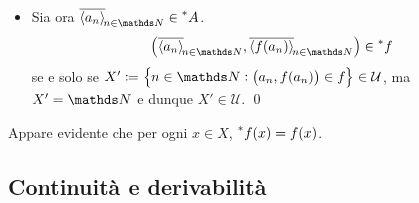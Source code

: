 {\begin{itemize}
        Si definisca dunque una successione $ \sequence{c_{n} } $: \begin{equation*}
            c_{n}= \begin{cases}
                b_{n} & n \in X\\ 
                f(a_{n}) & n \notin X 
            \end{cases} 
        \end{equation*}allora $ \filtersequence{c_{n}}=\filtersequence{b_{n}} $ poiché $ X \in \mathcal{U} $, e \begin{equation*}
            \forall\, n \in \N:\, c_{n} = f(a_{n}). 
        \end{equation*}Inoltre, per la Proposizione , $ \filtersequence{a_{n}} \in \nonstandard{A} $, e pertanto \begin{equation*}
            \left(\filtersequence{a_{n} }, \filtersequence{b_{n} }\right) \in \set{\left(\filtersequence{a_{n}}, \filtersequence{f(a_{n} )}\right): \filtersequence{a_{n}} \in \nonstandard{A}}.
        \end{equation*}
        \item[\boxed{\supseteq}] Sia ora $ \filtersequence{a_{n}} \in \nonstandard{A} $. \begin{equation*}
            \left(\filtersequence{a_{n}}, \filtersequence{f(a_{n} )}\right) \in \nonstandard{f}
        \end{equation*}se e solo se $ X'\coloneqq\set{n \in \N: \left(a_{n}, f(a_{n} ) \right) \in f} \in \mathcal{U} $, ma $ X' = \N $ e dunque $ X' \in \mathcal{U} $.
    \qed\end{itemize}
}

Appare evidente che per ogni $ x \in X $, $ \prescript{*}{}{f}(x)=f(x) $.

\subsection{Continuità e derivabilità}

